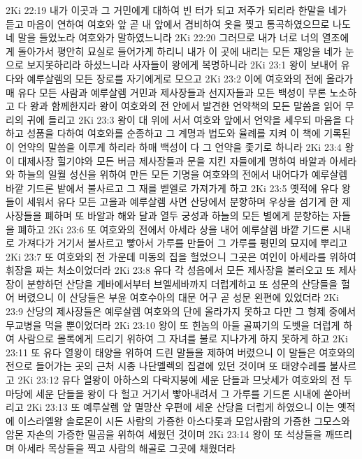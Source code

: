 2Ki 22:19  내가 이곳과 그 거민에게 대하여 빈 터가 되고 저주가 되리라 한말을 네가 듣고 마음이 연하여 여호와 앞 곧 내 앞에서 겸비하여 옷을 찢고 통곡하였으므로 나도 네 말을 들었노라 여호와가 말하였느니라
2Ki 22:20  그러므로 내가 너로 너의 열조에게 돌아가서 평안히 묘실로 들어가게 하리니 내가 이 곳에 내리는 모든 재앙을 네가 눈으로 보지못하리라 하셨느니라 사자들이 왕에게 복명하니라
2Ki 23:1  왕이 보내어 유다와 예루살렘의 모든 장로를 자기에게로 모으고
2Ki 23:2  이에 여호와의 전에 올라가매 유다 모든 사람과 예루살렘 거민과 제사장들과 선지자들과 모든 백성이 무론 노소하고 다 왕과 함께한지라 왕이 여호와의 전 안에서 발견한 언약책의 모든 말씀을 읽어 무리의 귀에 들리고
2Ki 23:3  왕이 대 위에 서서 여호와 앞에서 언약을 세우되 마음을 다하고 성품을 다하여 여호와를 순종하고 그 계명과 법도와 율례를 지켜 이 책에 기록된 이 언약의 말씀을 이루게 하리라 하매 백성이 다 그 언약을 좇기로 하니라
2Ki 23:4  왕이 대제사장 힐기야와 모든 버금 제사장들과 문을 지킨 자들에게 명하여 바알과 아세라와 하늘의 일월 성신을 위하여 만든 모든 기명을 여호와의 전에서 내어다가 예루살렘 바깥 기드론 밭에서 불사르고 그 재를 벧엘로 가져가게 하고
2Ki 23:5  옛적에 유다 왕들이 세워서 유다 모든 고을과 예루살렘 사면 산당에서 분향하며 우상을 섬기게 한 제사장들을 폐하며 또 바알과 해와 달과 열두 궁성과 하늘의 모든 별에게 분향하는 자들을 폐하고
2Ki 23:6  또 여호와의 전에서 아세라 상을 내어 예루살렘 바깥 기드론 시내로 가져다가 거기서 불사르고 빻아서 가루를 만들어 그 가루를 평민의 묘지에 뿌리고
2Ki 23:7  또 여호와의 전 가운데 미동의 집을 헐었으니 그곳은 여인이 아세라를 위하여 휘장을 짜는 처소이었더라
2Ki 23:8  유다 각 성읍에서 모든 제사장을 불러오고 또 제사장이 분향하던 산당을 게바에서부터 브엘세바까지 더럽게하고 또 성문의 산당들을 헐어 버렸으니 이 산당들은 부윤 여호수아의 대문 어구 곧 성문 왼편에 있었더라
2Ki 23:9  산당의 제사장들은 예루살렘 여호와의 단에 올라가지 못하고 다만 그 형제 중에서 무교병을 먹을 뿐이었더라
2Ki 23:10  왕이 또 힌놈의 아들 골짜기의 도벳을 더럽게 하여 사람으로 몰록에게 드리기 위하여 그 자녀를 불로 지나가게 하지 못하게 하고
2Ki 23:11  또 유다 열왕이 태양을 위하여 드린 말들을 제하여 버렸으니 이 말들은 여호와의 전으로 들어가는 곳의 근처 시종 나단멜렉의 집곁에 있던 것이며 또 태양수레를 불사르고
2Ki 23:12  유다 열왕이 아하스의 다락지붕에 세운 단들과 므낫세가 여호와의 전 두 마당에 세운 단들을 왕이 다 헐고 거기서 빻아내려서 그 가루를 기드론 시내에 쏟아버리고
2Ki 23:13  또 예루살렘 앞 멸망산 우편에 세운 산당을 더럽게 하였으니 이는 옛적에 이스라엘왕 솔로몬이 시돈 사람의 가증한 아스다롯과 모압사람의 가증한 그모스와 암몬 자손의 가증한 밀곰을 위하여 세웠던 것이며
2Ki 23:14  왕이 또 석상들을 깨뜨리며 아세라 목상들을 찍고 사람의 해골로 그곳에 채웠더라

